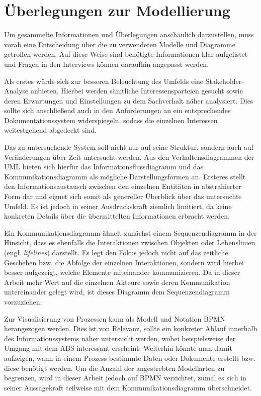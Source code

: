 \section{Überlegungen zur Modellierung}

Um gesammelte Informationen und Überlegungen anschaulich darzustellen, muss vorab eine Entscheidung über die zu verwendeten Modelle und Diagramme getroffen werden. Auf diese Weise sind benötigte Informationen klar aufgelistet und Fragen in den Interviews können daraufhin angepasst werden.

Als erstes würde sich zur besseren Beleuchtung des Umfelds eine Stakeholder-Analyse anbieten. Hierbei werden sämtliche Interessensparteien gesucht sowie deren Erwartungen und Einstellungen zu dem Sachverhalt näher analysiert. Dies sollte sich anschließend auch in den Anforderungen an ein entsprechendes Dokumentationssystem widerspiegeln, sodass die einzelnen Interessen weitestgehend abgedeckt sind.

Das zu untersuchende System soll nicht nur auf seine Struktur, sondern auch auf Veränderungen über Zeit untersucht werden. Aus den Verhaltensdiagrammen der UML bieten sich hierfür das Informationsflussdiagramm und das Kommunikationsdiagramm als mögliche Darstellungsformen an. Ersteres stellt den Informationsaustausch zwischen den einzelnen Entitäten in abstrahierter Form dar und eignet sich somit als genereller Überblick über das untersuchte Umfeld. Es ist jedoch in seiner Ausdruckskraft ziemlich limitiert, da keine konkreten Details über die übermittelten Informationen erbracht werden.

Ein Kommunikationsdiagramm ähnelt zunächst einem Sequenzendiagramm in der Hinsicht, dass es ebenfalls die Interaktionen zwischen Objekten oder Lebenslinien (engl. \textit{lifelines}) darstellt. Es legt den Fokus jedoch nicht auf das zeitliche Geschehen bzw. die Abfolge der einzelnen Interaktionen, sondern wird hierbei besser aufgezeigt, welche Elemente miteinander kommunizieren. Da in dieser Arbeit mehr Wert auf die einzelnen Akteure sowie deren Kommunikation untereinander gelegt wird, ist dieses Diagramm dem Sequenzendiagramm vorzuziehen.

Zur Visualisierung von Prozessen kann als Modell und Notation BPMN herangezogen werden. Dies ist von Relevanz, sollte ein konkreter Ablauf innerhalb des Informationssystems näher untersucht werden, wobei beispielsweise der Umgang mit dem ABS interessant erscheint. Weiterhin könnte man damit aufzeigen, wann in einem Prozess bestimmte Daten oder Dokumente erstellt bzw. diese benötigt werden. Um die Anzahl der angestrebten Modellarten zu begrenzen, wird in dieser Arbeit jedoch auf BPMN verzichtet, zumal es sich in seiner Aussagekraft teilweise mit dem Kommunikationsdiagramm überschneidet.

